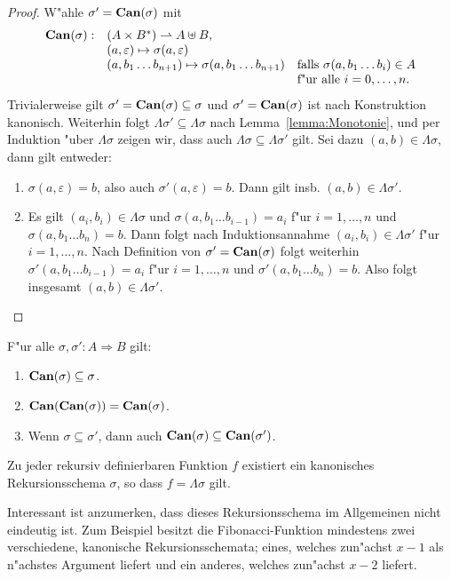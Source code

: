 \documentclass[12pt,a4paper]{article}
\begin{document}
\begin{proof}
  W"ahle $\sigma' = \mathbf{Can}(\sigma)$ mit
  \[\begin{array}{rll}
    \mathbf{Can}(\sigma):& (A \times B^*) \rightharpoonup A \uplus B, \\
    & (a,\varepsilon) \mapsto \sigma(a,\varepsilon) \\
    & (a,b_1 \ldots b_{n+1}) \mapsto \sigma(a,b_1 \ldots b_{n+1}) & \text{falls $\sigma(a,b_1 \ldots b_i)\in A$} \\
    && \text{f"ur alle $i =0,\ldots,n$.}
  \end{array}\]
  Trivialerweise gilt $\sigma' = \mathbf{Can}(\sigma) \subseteq \sigma$ und $\sigma' = \mathbf{Can}(\sigma)$ ist nach
  Konstruktion kanonisch. Weiterhin folgt $\Lambda \sigma' \subseteq \Lambda \sigma$ nach
  Lemma~\ref{lemma:Monotonie}, und per Induktion "uber $\Lambda \sigma$ zeigen wir, dass auch
  $\Lambda \sigma \subseteq \Lambda \sigma'$ gilt. Sei dazu $(a,b) \in \Lambda \sigma$, dann
  gilt entweder:
  \begin{enumerate}
  \item $\sigma(a,\varepsilon)=b$, also auch $\sigma'(a,\varepsilon)=b$. Dann gilt insb. $(a,b)\in\Lambda\sigma'$.
  \item Es gilt $(a_i,b_i)\in\Lambda \sigma$ und $\sigma(a,b_1 \ldots b_{i-1})=a_i$ f"ur $i=1,\ldots,n$ und
    $\sigma(a,b_1 \ldots b_n) = b$. Dann folgt nach Induktionsannahme $(a_i,b_i) \in \Lambda \sigma'$ f"ur
    $i=1,\ldots,n$. Nach Definition von $\sigma' = \mathbf{Can}(\sigma)$ folgt weiterhin $\sigma'(a,b_1 \ldots b_{i-1})=a_i$
    f"ur $i=1,\ldots,n$ und $\sigma'(a,b_1 \ldots b_n)=b$. Also folgt insgesamt $(a,b) \in \Lambda\sigma'$.
  \end{enumerate}
\end{proof}

\begin{corollary}
  F"ur alle $\sigma,\sigma':A \Rightarrow B$ gilt:
  \begin{enumerate}
  \item $\mathbf{Can}(\sigma) \subseteq \sigma$.
  \item $\mathbf{Can}(\mathbf{Can}(\sigma)) = \mathbf{Can}(\sigma)$.
  \item Wenn $\sigma \subseteq \sigma'$, dann auch $\mathbf{Can}(\sigma) \subseteq \mathbf{Can}(\sigma')$.
  \end{enumerate}
\end{corollary}

\begin{lemma}
  Zu jeder rekursiv definierbaren Funktion $f$ existiert ein kanonisches Rekursionsschema $\sigma$,
  so dass $f = \Lambda \sigma$ gilt.
\end{lemma}
Interessant ist anzumerken, dass dieses Rekursionsschema im Allgemeinen nicht eindeutig ist. Zum
Beispiel besitzt die Fibonacci-Funktion mindestens zwei verschiedene, kanonische Rekursionsschemata;
eines, welches zun"achst $x-1$ als n"achstes Argument liefert und ein anderes, welches zun"achst
$x-2$ liefert.
\end{document}
